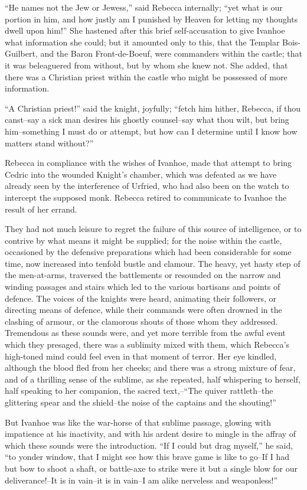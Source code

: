 ``He names not the Jew or Jewess,'' said Rebecca internally; ``yet what
is our portion in him, and how justly am I punished by Heaven for
letting my thoughts dwell upon him!'' She hastened after this brief
self-accusation to give Ivanhoe what information she could; but it
amounted only to this, that the Templar Bois-Guilbert, and the Baron
Front-de-Boeuf, were commanders within the castle; that it was
beleaguered from without, but by whom she knew not. She added, that
there was a Christian priest within the castle who might be possessed of
more information.

``A Christian priest!'' said the knight, joyfully; ``fetch him hither,
Rebecca, if thou canst--say a sick man desires his ghostly counsel--say
what thou wilt, but bring him--something I must do or attempt, but how
can I determine until I know how matters stand without?''

Rebecca in compliance with the wishes of Ivanhoe, made that attempt to
bring Cedric into the wounded Knight's chamber, which was defeated as we
have already seen by the interference of Urfried, who had also been on
the watch to intercept the supposed monk. Rebecca retired to communicate
to Ivanhoe the result of her errand.

They had not much leisure to regret the failure of this source of
intelligence, or to contrive by what means it might be supplied; for the
noise within the castle, occasioned by the defensive preparations which
had been considerable for some time, now increased into tenfold bustle
and clamour. The heavy, yet hasty step of the men-at-arms, traversed the
battlements or resounded on the narrow and winding passages and stairs
which led to the various bartisans and points of defence. The voices of
the knights were heard, animating their followers, or directing means of
defence, while their commands were often drowned in the clashing of
armour, or the clamorous shouts of those whom they addressed. Tremendous
as these sounds were, and yet more terrible from the awful event which
they presaged, there was a sublimity mixed with them, which Rebecca's
high-toned mind could feel even in that moment of terror. Her eye
kindled, although the blood fled from her cheeks; and there was a strong
mixture of fear, and of a thrilling sense of the sublime, as she
repeated, half whispering to herself, half speaking to her companion,
the sacred text,--``The quiver rattleth--the glittering spear and the
shield--the noise of the captains and the shouting!''

But Ivanhoe was like the war-horse of that sublime passage, glowing with
impatience at his inactivity, and with his ardent desire to mingle in
the affray of which these sounds were the introduction. ``If I could but
drag myself,'' he said, ``to yonder window, that I might see how this
brave game is like to go--If I had but bow to shoot a shaft, or
battle-axe to strike were it but a single blow for our deliverance!--It
is in vain--it is in vain--I am alike nerveless and weaponless!''

